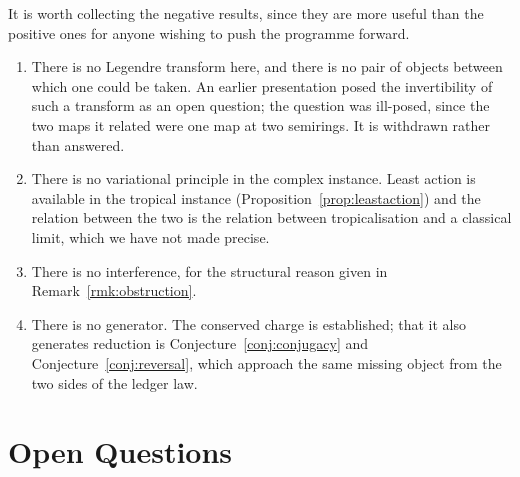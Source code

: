 It is worth collecting the negative results, since they are more useful
than the positive ones for anyone wishing to push the programme forward.

\begin{enumerate}[itemsep=4pt]
  \item There is no Legendre transform here, and there is no pair of
        objects between which one could be taken.  An earlier presentation
        posed the invertibility of such a transform as an open question;
        the question was ill-posed, since the two maps it related were one
        map at two semirings.  It is withdrawn rather than answered.

  \item There is no variational principle in the complex instance.  Least
        action is available in the tropical instance
        (Proposition~\ref{prop:leastaction}) and the relation between the
        two is the relation between tropicalisation and a classical limit,
        which we have not made precise.

  \item There is no interference, for the structural reason given in
        Remark~\ref{rmk:obstruction}.

  \item There is no generator.  The conserved charge is established; that
        it also generates reduction is Conjecture~\ref{conj:conjugacy} and
        Conjecture~\ref{conj:reversal}, which approach the same missing
        object from the two sides of the ledger law.
\end{enumerate}

\section{Open Questions}

